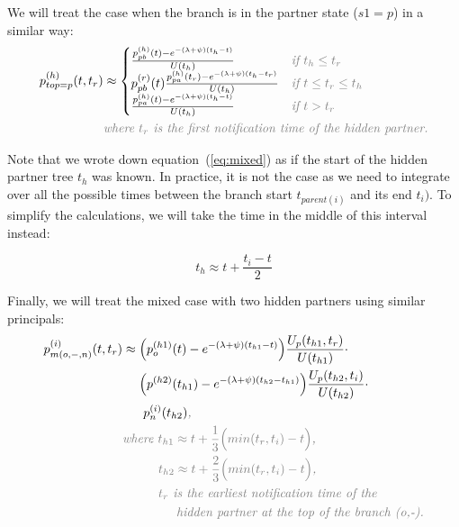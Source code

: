 \documentclass[a4paper,10pt]{article}
\begin{document}
We will treat the case when the branch is in the partner state ($s1=p$) in a similar way:
\begin{equation}
\begin{split}
p_{top=p}^{(h)}(t, t_r) &\approx 
\begin{cases}
\frac{p_{pb}^{(h)}(t) -e^{-(\lambda + \psi)(t_{h} - t)}}{U(t_{h})}&\textit{\color{gray} if $t_h \leq t_r$}\\
p_{pb}^{(r)}(t)\frac{p_{pa}^{(h)}(t_r) -e^{-(\lambda + \psi)(t_{h} - t_r)}}{U(t_{h})}&\textit{\color{gray} if $t \leq t_r \leq t_h$}\\
\frac{p_{pa}^{(h)}(t) -e^{-(\lambda + \psi)(t_{h} - t)}}{U(t_{h})}&\textit{\color{gray} if $t > t_r$}\\
\end{cases}\\
&\textit{\color{gray}where $t_r$ is the first notification time of the hidden partner.}\\
\end{split}
\end{equation}


Note that we wrote down equation~(\ref{eq:mixed}) as if the start of the hidden partner tree $t_h$ was known. In practice, it is not the case as we need to integrate over all the possible times between the branch start $t_{parent(i)}$ and its end $t_i)$. To simplify the calculations, we will take the time in the middle of this interval instead: 

\begin{equation}
t_h \approx t + \frac{t_i - t}{2}
\end{equation}


Finally, we will treat the mixed case with two hidden partners using similar principals:
\begin{equation}
\begin{split}
p_{m(o,-,n)}^{(i)}(t,t_r) &\approx \Big(p_{o}^{(h1)}(t) -e^{-(\lambda + \psi)(t_{h1} - t)}\Big)\frac{U_p(t_{h1},t_{r})}{U(t_{h1})}\cdot
\\
&~~~~\Big(p^{(h2)}(t_{h1}) -e^{-(\lambda + \psi)(t_{h2} - t_{h1})}\Big)\frac{U_p(t_{h2},t_{i})}{U(t_{h2})}\cdot
\\
&~~~~~p_n^{(i)}(t_{h2})\textit{\color{gray},}\\
&\textit{\color{gray}where $t_{h1} \approx t + \frac{1}{3}\Big(min(t_{r}, t_i) - t\Big)$,}\\
&\textit{\color{gray}~~~~~~~~$t_{h2} \approx t + \frac{2}{3}\Big(min(t_{r}, t_i) - t\Big)$,}\\
&\textit{\color{gray}~~~~~~~~$t_{r}$ is the earliest notification time of the }\\
&\textit{\color{gray}~~~~~~~~~~~~hidden partner at the top of the branch (o,-).}\\
\end{split}\label{eq:p_mixed_mixed}
\end{equation}
\end{document}
